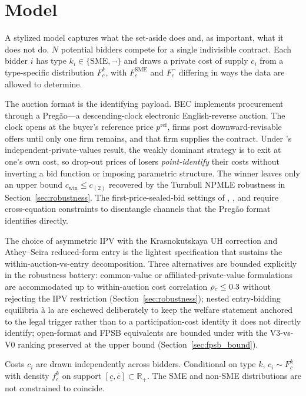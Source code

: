 \section{Model}\label{sec:model}

A stylized model captures what the set-aside does and, as important, what it does not do. $N$ potential bidders compete for a single indivisible contract. Each bidder $i$ has type $k_i \in \{\text{SME}, \neg\}$ and draws a private cost of supply $c_i$ from a type-specific distribution $F_c^k$, with $F_c^{\text{SME}}$ and $F_c^{\neg}$ differing in ways the data are allowed to determine.

The auction format is the identifying payload. BEC implements procurement through a Preg\~ao---a descending-clock electronic English-reverse auction. The clock opens at the buyer's reference price $p^{\mathrm{ref}}$, firms post downward-revisable offers until only one firm remains, and that firm supplies the contract. Under \citet{haile2003}'s independent-private-values result, the weakly dominant strategy is to exit at one's own cost, so drop-out prices of losers \emph{point-identify} their costs without inverting a bid function or imposing parametric structure. The winner leaves only an upper bound $c_{\text{win}} \le c_{(2)}$ recovered by the Turnbull NPMLE robustness in Section~\ref{sec:robustness}. The first-price-sealed-bid settings of \citet{marion2007}, \citet{krasnokutskaya2011}, and \citet{atheyseira2011} require cross-equation constraints to disentangle channels that the Preg\~ao format identifies directly.

The choice of asymmetric IPV with the Krasnokutskaya UH correction and Athey--Seira reduced-form entry is the lightest specification that sustains the within-auction-vs-entry decomposition. Three alternatives are bounded explicitly in the robustness battery: common-value or affiliated-private-value formulations \citep{milgrom1982, hong2003} are accommodated up to within-auction cost correlation $\rho_c \le 0.3$ without rejecting the IPV restriction (Section~\ref{sec:robustness}); nested entry-bidding equilibria \`a la \citet{krasnokutskayaseim2011} are eschewed deliberately to keep the welfare statement anchored to the legal trigger rather than to a participation-cost identity it does not directly identify; open-format and FPSB equivalents are bounded under \citet{maskinriley2000} with the V3-vs-V0 ranking preserved at the upper bound (Section~\ref{sec:fpsb_bound}).

\begin{assumption}\label{a:ipv}
Costs $c_i$ are drawn independently across bidders. Conditional on type $k$, $c_i \sim F_c^k$ with density $f_c^k$ on support $[\underline{c}, \overline{c}] \subset \mathbb{R}_+$. The SME and non-SME distributions are not constrained to coincide.
\end{assumption}


